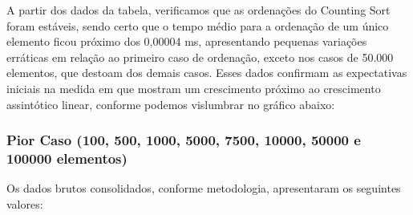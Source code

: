 \documentclass[a4paper, 12pt]{article}
\begin{document}
A partir dos dados da tabela, verificamos que as ordenações do Counting Sort foram estáveis, sendo certo que o tempo médio para a ordenação de um único elemento ficou próximo dos 0,00004 ms, apresentando pequenas variações erráticas em relação ao primeiro caso de ordenação, exceto nos casos de 50.000 elementos, que destoam dos demais casos. Esses dados confirmam as expectativas iniciais na medida em que mostram um crescimento próximo ao crescimento assintótico linear, conforme podemos vislumbrar no gráfico abaixo:
\vspace{0.3cm}
\begin{center}
\end{center}

\subsubsection{Pior Caso (100, 500, 1000, 5000, 7500, 10000, 50000 e 100000 elementos)}

\tab{ }Os dados brutos consolidados, conforme metodologia, apresentaram os seguintes valores:
\vspace{0.3cm}
\end{document}
